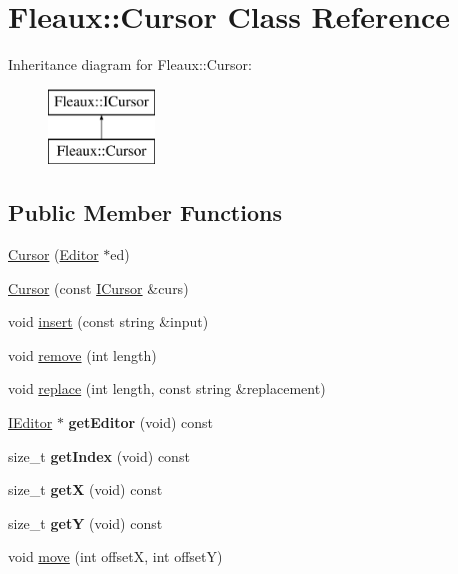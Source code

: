 \hypertarget{classFleaux_1_1Cursor}{}\section{Fleaux\+:\+:Cursor Class Reference}
\label{classFleaux_1_1Cursor}
Inheritance diagram for Fleaux\+:\+:Cursor\+:\begin{figure}[H]
\begin{center}
\leavevmode
\includegraphics[height=2.000000cm]{classFleaux_1_1Cursor}
\end{center}
\end{figure}
\subsection*{Public Member Functions}
\begin{DoxyCompactItemize}
\item 
\hyperlink{classFleaux_1_1Cursor_aa2811c8ebadd1b019a1d1099eb401e3b}{Cursor} (\hyperlink{classFleaux_1_1Editor}{Editor} $\ast$ed)
\item 
\hyperlink{classFleaux_1_1Cursor_a643ea893489f5a963473dc79afd65bd2}{Cursor} (const \hyperlink{classFleaux_1_1ICursor}{I\+Cursor} \&curs)
\item 
void \hyperlink{classFleaux_1_1Cursor_a99c820ad3d952b5e38a41a11c18e7c2f}{insert} (const string \&input)
\item 
void \hyperlink{classFleaux_1_1Cursor_a0fca52d6d4e589f8eef50a351e8340ff}{remove} (int length)
\item 
void \hyperlink{classFleaux_1_1Cursor_a439606f718dd885f4f96ca3244c3172a}{replace} (int length, const string \&replacement)
\item 
\hypertarget{classFleaux_1_1Cursor_a9cdba74fcd1c812bdfd97b671fbef659}{}\hyperlink{classFleaux_1_1IEditor}{I\+Editor} $\ast$ {\bfseries get\+Editor} (void) const \label{classFleaux_1_1Cursor_a9cdba74fcd1c812bdfd97b671fbef659}

\item 
\hypertarget{classFleaux_1_1Cursor_a7358d0be48db3117802279959c125eb8}{}size\+\_\+t {\bfseries get\+Index} (void) const \label{classFleaux_1_1Cursor_a7358d0be48db3117802279959c125eb8}

\item 
\hypertarget{classFleaux_1_1Cursor_a3dc9befeb121b6a536da063560f81af0}{}size\+\_\+t {\bfseries get\+X} (void) const \label{classFleaux_1_1Cursor_a3dc9befeb121b6a536da063560f81af0}

\item 
\hypertarget{classFleaux_1_1Cursor_ab265ba6839087cbe810c27fe59e9f593}{}size\+\_\+t {\bfseries get\+Y} (void) const \label{classFleaux_1_1Cursor_ab265ba6839087cbe810c27fe59e9f593}

\item 
void \hyperlink{classFleaux_1_1Cursor_a91e3ff97154764836099fdb13002c877}{move} (int offset\+X, int offset\+Y)
\end{DoxyCompactItemize}
